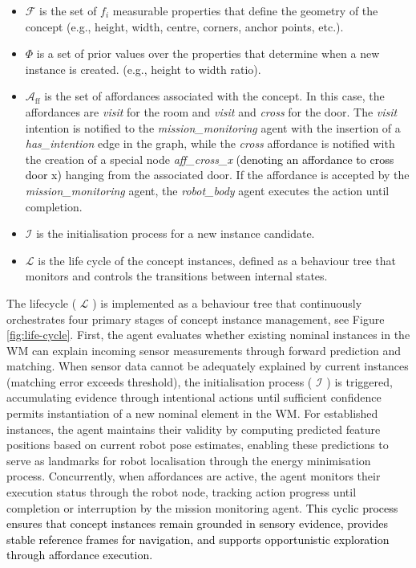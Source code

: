 \documentclass[10pt,a4paper]{article}
\begin{document}
\begin{itemize}
  \item \( \mathcal{F} \) is the set of $f_i$ measurable properties that define the geometry of the concept (e.g., height, width, centre, corners, anchor points, etc.).
  \item \( \Phi \) is a set of prior values over the properties that determine when a new instance is created. (e.g., height to width ratio).
  \item $\mathcal{A}_{\text{ff}}$ is the set of affordances associated with the concept. In this case, the affordances are \textit{visit} for the room and \textit{visit} and \textit{cross} for the door. The \textit{visit} intention is notified to the \textit{mission\_monitoring} agent with the insertion of a \textit{has\_intention} edge in the graph, while the \textit{cross} affordance is notified with the creation of a special node \textit{aff\_cross\_x} \textcolor{black}{(denoting an affordance to cross door x)} hanging from the associated door. If the affordance is accepted by the \textit{mission\_monitoring} agent, the \textit{robot\_body} agent executes the action until completion.
  \item $\mathcal{I}$ is the initialisation process for a new instance candidate. 
  \item \(  \mathcal{L}\) is the life cycle of the concept instances, defined as a behaviour tree that monitors and controls the transitions between internal states.
\end{itemize}

The lifecycle ( $\mathcal{L}$ ) is implemented as a behaviour tree that continuously orchestrates four primary stages of concept instance management, see Figure \ref{fig:life-cycle}. First, the agent evaluates whether existing nominal instances in the WM can explain incoming sensor measurements through forward prediction and matching. When sensor data cannot be adequately explained by current instances (matching error exceeds threshold), the initialisation process ( $\mathcal{I}$ ) is triggered, accumulating evidence through intentional actions until sufficient confidence permits instantiation of a new nominal element in the WM. For established instances, the agent maintains their validity by computing predicted feature positions based on current robot pose estimates, enabling these predictions to serve as landmarks for robot localisation through the energy minimisation process. Concurrently, when affordances are active, the agent monitors their execution status through the robot node, tracking action progress until completion or interruption by the mission monitoring agent. \textcolor{black}{This cyclic process ensures that concept instances remain grounded in sensory evidence, provides stable reference frames for navigation, and supports opportunistic exploration through affordance execution.}
\end{document}
